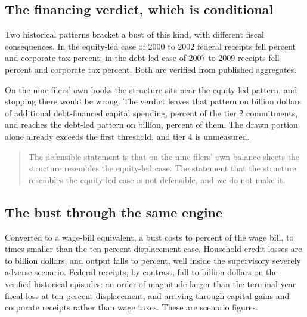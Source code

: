 \subsection{The financing verdict, which is conditional}

Two historical patterns bracket a bust of this kind, with different fiscal consequences. In the
equity-led case of 2000 to 2002 federal receipts fell  percent and
corporate tax  percent; in the debt-led case of 2007 to 2009 receipts
fell  percent and corporate tax  percent.
Both are verified from published aggregates.

On the nine filers' own books the structure sits near the equity-led pattern, and stopping there
would be wrong. The verdict leaves that pattern on  billion dollars of
additional debt-financed capital spending,  percent of the tier 2
commitments, and reaches the debt-led pattern on  billion,
 percent of them. The drawn portion alone already exceeds the first
threshold, and tier 4 is unmeasured.

\begin{quote}
The defensible statement is that on the nine filers' own balance sheets the structure resembles
the equity-led case. The statement that the structure resembles the equity-led case is not
defensible, and we do not make it.
\end{quote}

\subsection{The bust through the same engine}

Converted to a wage-bill equivalent, a bust costs  to 
percent of the wage bill,  to  times smaller than the
ten percent displacement case. Household credit losses are  to
 billion dollars, and output falls  to
 percent, well inside the supervisory severely adverse scenario. Federal
receipts, by contrast, fall  to  billion dollars
on the verified historical episodes: an order of magnitude larger than the terminal-year fiscal
loss at ten percent displacement, and arriving through capital gains and corporate receipts rather
than wage taxes. These are scenario figures.

